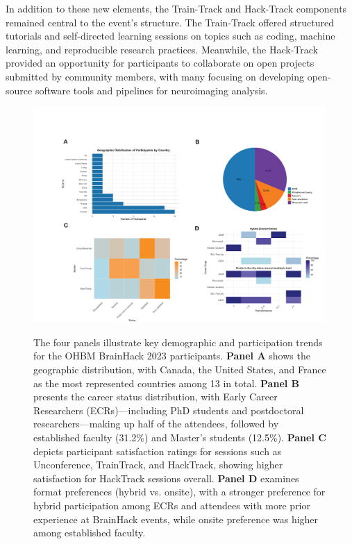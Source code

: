\documentclass{article}
\begin{document}
In addition to these new elements, the Train-Track and Hack-Track components remained central to the event's structure.
The Train-Track offered structured tutorials and self-directed learning sessions on topics such as coding, machine learning, and reproducible research practices.
Meanwhile, the Hack-Track provided an opportunity for participants to collaborate on open projects submitted by community members, with many focusing on developing open-source software tools and pipelines for neuroimaging analysis.

\begin{figure}[h]
    \centering
    \includegraphics[width=0.99\textwidth]{images/demographics.png}
    \label{fig:demographics}
    \caption{
        The four panels illustrate key demographic and participation trends for the OHBM BrainHack 2023 participants.
        \textbf{Panel A} shows the geographic distribution, with Canada, the United States, and France as the most represented countries among 13 in total.
        \textbf{Panel B} presents the career status distribution, with Early Career Researchers (ECRs)—including PhD students and postdoctoral researchers—making up half of the attendees, followed by established faculty (31.2\%) and Master's students (12.5\%).
        \textbf{Panel C} depicts participant satisfaction ratings for sessions such as Unconference, TrainTrack, and HackTrack, showing higher satisfaction for HackTrack sessions overall.
        \textbf{Panel D} examines format preferences (hybrid vs. onsite), with a stronger preference for hybrid participation among ECRs and attendees with more prior experience at BrainHack events, while onsite preference was higher among established faculty.
    }
\end{figure}
\end{document}
